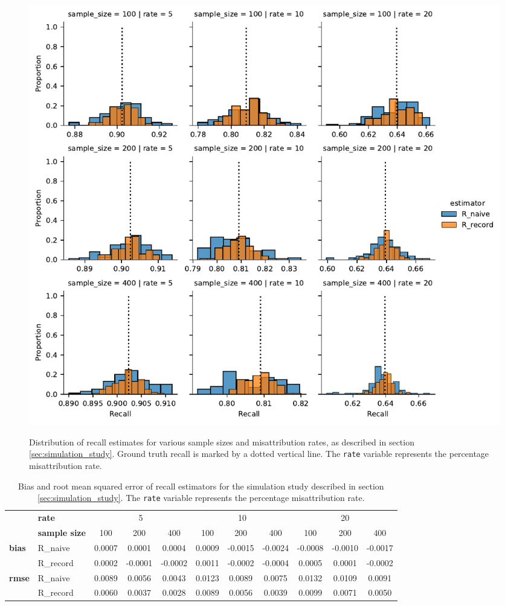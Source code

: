 \documentclass[fontsize=11pt]{article}
\theoremstyle{definition}
\begin{document}
\begin{figure}
    \centering
        \caption{Distribution of recall estimates for various sample sizes and misattribution rates, as described in section \ref{sec:simulation_study}. Ground truth recall is marked by a dotted vertical line. The \texttt{rate} variable represents the percentage misattribution rate.}
    \includegraphics[width=\linewidth]{sim_records_recall}
    \label{fig:recall_results}
\end{figure}

\begin{table}
    \centering
    \caption{\label{tab:recall_results}\centering Bias and root mean squared error of recall estimators for the simulation study described in section \ref{sec:simulation_study}. The \texttt{rate} variable represents the percentage misattribution rate.}
\begin{tabular}{llccccccccc}
\toprule
{} & {\textbf{rate}} & \multicolumn{3}{c}{{5}} & \multicolumn{3}{c}{10} & \multicolumn{3}{c}{20} \\
\cmidrule(lr){3-5}\cmidrule(lr){6-8}\cmidrule(lr){9-11}
{} & {\textbf{sample size}} & {100} & {200} & {400} & {100} & {200} & {400} & {100} & {200} & {400} \\
\midrule
\multirow[c]{2}{*}{\textbf{bias}} & R\_naive & 0.0007 & 0.0001 & 0.0004 & 0.0009 & -0.0015 & -0.0024 & -0.0008 & -0.0010 & -0.0017 \\
 & R\_record & 0.0002 & -0.0001 & -0.0002 & 0.0011 & -0.0002 & -0.0004 & 0.0005 & 0.0001 & -0.0002 \\
 \midrule
\multirow[c]{2}{*}{\textbf{rmse}} & R\_naive & 0.0089 & 0.0056 & 0.0043 & 0.0123 & 0.0089 & 0.0075 & 0.0132 & 0.0109 & 0.0091 \\
 & R\_record & 0.0060 & 0.0037 & 0.0028 & 0.0089 & 0.0056 & 0.0039 & 0.0099 & 0.0071 & 0.0050 \\
\bottomrule
\end{tabular}


\end{table}
\end{document}
